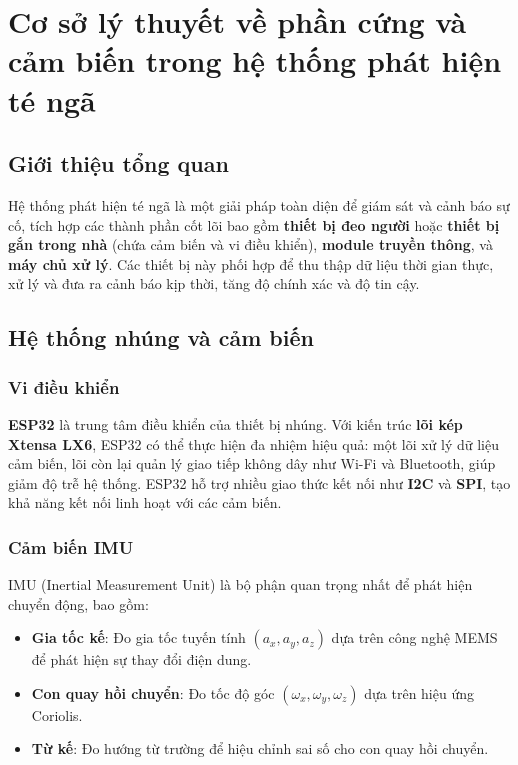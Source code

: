 
\section{Cơ sở lý thuyết về phần cứng và cảm biến trong hệ thống phát hiện té ngã}

\subsection{Giới thiệu tổng quan}
Hệ thống phát hiện té ngã là một giải pháp toàn diện để giám sát và cảnh báo sự cố, tích hợp các thành phần cốt lõi bao gồm \textbf{thiết bị đeo người} hoặc \textbf{thiết bị gắn trong nhà} (chứa cảm biến và vi điều khiển), \textbf{module truyền thông}, và \textbf{máy chủ xử lý}. Các thiết bị này phối hợp để thu thập dữ liệu thời gian thực, xử lý và đưa ra cảnh báo kịp thời, tăng độ chính xác và độ tin cậy.

\subsection{Hệ thống nhúng và cảm biến}

\subsubsection{Vi điều khiển}
\textbf{ESP32} là trung tâm điều khiển của thiết bị nhúng. Với kiến trúc \textbf{lõi kép Xtensa LX6}, ESP32 có thể thực hiện đa nhiệm hiệu quả: một lõi xử lý dữ liệu cảm biến, lõi còn lại quản lý giao tiếp không dây như Wi-Fi và Bluetooth, giúp giảm độ trễ hệ thống. ESP32 hỗ trợ nhiều giao thức kết nối như \textbf{I2C} và \textbf{SPI}, tạo khả năng kết nối linh hoạt với các cảm biến.

\subsubsection{Cảm biến IMU}
IMU (Inertial Measurement Unit) là bộ phận quan trọng nhất để phát hiện chuyển động, bao gồm:
\begin{itemize}
    \item \textbf{Gia tốc kế}: Đo gia tốc tuyến tính $(a_x, a_y, a_z)$ dựa trên công nghệ MEMS để phát hiện sự thay đổi điện dung.
    \item \textbf{Con quay hồi chuyển}: Đo tốc độ góc $(\omega_x, \omega_y, \omega_z)$ dựa trên hiệu ứng Coriolis.
    \item \textbf{Từ kế}: Đo hướng từ trường để hiệu chỉnh sai số cho con quay hồi chuyển.
\end{itemize}

